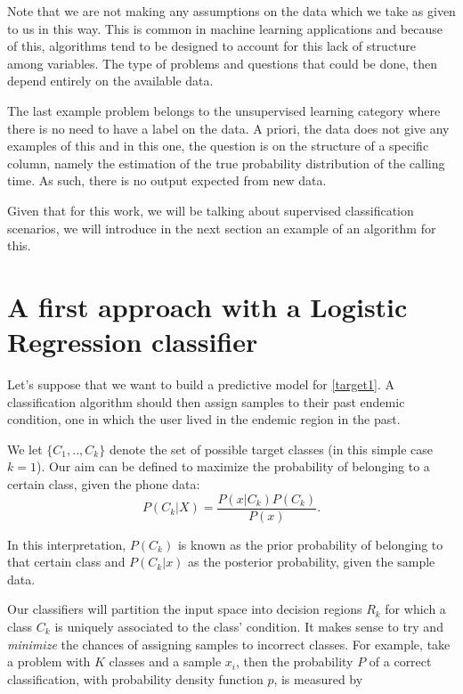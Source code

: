 Note that we are not making any assumptions on the data which we take as given to us in this way.
This is common in machine learning applications and because of this, algorithms tend to be designed to account for this lack of structure among variables.
The type of problems and questions that could be done, then depend entirely on the available data.

The last example problem belongs to the unsupervised learning category where there is no need to have a label on the data.
A priori, the data does not give any examples of this and in this one, the question is on the structure of a specific column, namely the estimation of the true probability distribution of the calling time.
As such, there is no output expected from new data.

Given that for this work, we will be talking about supervised classification scenarios, we will introduce in the next section an example of an algorithm for this.

\section{A first approach with a Logistic Regression classifier}\label{section-logisticRegression}

Let's suppose that we want to build a predictive model for \cref{target1}.
A classification algorithm should then assign samples to their past endemic condition, one in which the user lived in the endemic region in the past.

We let $\{C_1,..,C_k\}$ denote the set of possible target classes (in this simple case $k=1$).
Our aim can be defined to maximize the probability of belonging to a certain class, given the phone data:
\begin{equation}
P(C_k| X) = \frac{P(x|C_k)P(C_k)}{P(x)} .
\end{equation}

In this interpretation, $P(C_k)$ is known as the prior probability of belonging to that certain class and $P(C_k|x)$ as the posterior probability, given the sample data.

Our classifiers will partition the input space into decision regions $R_k$ for which a class $C_k$ is uniquely associated to the class' condition.
It makes sense to try and \textit{minimize} the chances of assigning samples to incorrect classes.
For example, take a problem with $K$ classes and a sample $x_i$, then the probability $P$ of a correct classification, with probability density function $p$, is measured by

